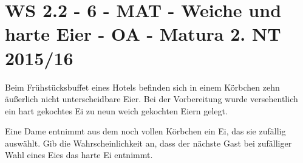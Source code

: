 \section{WS 2.2 - 6 - MAT - Weiche und harte Eier - OA - Matura 2. NT 2015/16}

\begin{beispiel}{0} %
Beim Frühstücksbuffet eines Hotels befinden sich in einem Körbchen zehn äußerlich nicht unterscheidbare Eier. Bei der Vorbereitung wurde versehentlich ein hart gekochtes Ei zu neun weich gekochten Eiern gelegt. \leer

Eine Dame entnimmt aus dem noch vollen Körbchen ein Ei, das sie zufällig auswählt.
Gib die Wahrscheinlichkeit an, dass der nächste Gast bei zufälliger Wahl eines Eies das
harte Ei entnimmt.

\end{beispiel}